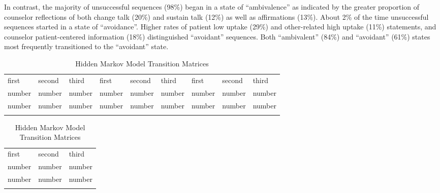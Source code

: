 In contrast, the majority of unsuccessful sequences (98\%) began in a state of “ambivalence” as indicated by the greater proportion of counselor reflections of both change talk (20\%) and sustain talk (12\%) as well as affirmations (13\%). About 2\% of the time unsuccessful sequences started in a state of “avoidance”. Higher rates of patient low uptake (29\%) and other-related high uptake (11\%) statements, and counselor patient-centered information (18\%) distinguished “avoidant” sequences. Both “ambivalent” (84\%) and “avoidant” (61\%) states most frequently transitioned to the “avoidant” state.

\begin{table}
\vspace{15\baselineskip}

\caption{Hidden Markov Model Emission Matrices}
\label{tab:emission}
\begin{tabularx}{\textwidth}{lllllllll}
\hline\noalign{\smallskip}
first & second & third & first & second & third & first & second & third  \\
\noalign{\smallskip}\hline\noalign{\smallskip}
number & number & number & number & number & number & number & number & number\\
number & number & number & number & number & number & number & number & number\\
\noalign{\smallskip}\hline
\end{tabularx}

\vspace{2\baselineskip}

\caption{Hidden Markov Model Transition Matrices}
\label{tab:transition}  
\begin{tabularx}{\textwidth}{lll}
\hline\noalign{\smallskip}
first & second & third  \\
\noalign{\smallskip}\hline\noalign{\smallskip}
number & number & number \\
number & number & number \\
\noalign{\smallskip}\hline
\end{tabularx}
\end{table}

